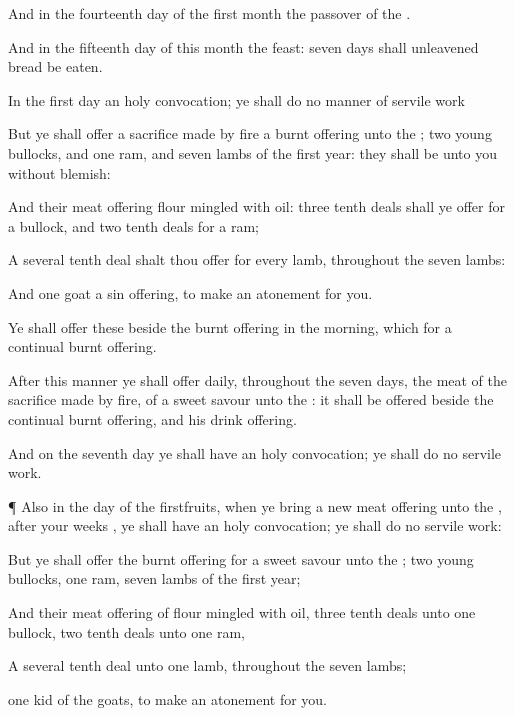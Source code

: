 {\par }{\PP {}And in the
fourteenth
day of the
first
month
{} the
passover of the
{}.

And in the
fifteenth
day of this
month
{} the
feast:
seven
days shall unleavened
bread be
eaten.

In the
first
day
{} an
holy
convocation; ye shall
do no manner of
servile
work
{}

But ye shall
offer a sacrifice made by
fire
{} a burnt
offering unto the
{};
two
young
bullocks, and
one
ram, and
seven
lambs of the
first
year: they shall be unto you without
blemish:

And their meat
offering
{}
flour
mingled with
oil:
three tenth
deals shall ye
offer for a
bullock, and
two tenth
deals for a
ram;

A several tenth
deal shalt thou
offer for
every
lamb, throughout the
seven
lambs:

And
one
goat
{} a sin
offering, to make an
atonement for you.

Ye shall
offer these beside the burnt
offering in the
morning, which
{} for a
continual burnt
offering.

After this manner ye shall
offer
daily, throughout the
seven
days, the
meat of the sacrifice made by
fire, of a
sweet
savour unto the
{}: it shall be
offered beside the
continual burnt
offering, and his drink
offering.

And on the
seventh
day ye shall have an
holy
convocation; ye shall
do no
servile
work.


\par }{\PP {}¶ Also in the
day of the
firstfruits, when ye
bring a
new meat
offering unto the
{}, after your
weeks
{}, ye shall have an
holy
convocation; ye shall
do no
servile
work:

But ye shall
offer the burnt
offering for a
sweet
savour unto the
{};
two
young
bullocks,
one
ram,
seven
lambs of the
first
year;

And their meat
offering of
flour
mingled with
oil,
three tenth
deals unto
one
bullock,
two tenth
deals unto
one
ram,

A several tenth
deal unto
one
lamb, throughout the
seven
lambs;

one
kid of the
goats, to make an
atonement for you.

}
